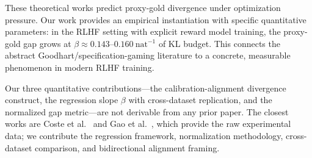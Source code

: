 These theoretical works predict proxy-gold divergence under optimization pressure. Our work provides an empirical instantiation with specific quantitative parameters: in the RLHF setting with explicit reward model training, the proxy-gold gap grows at $\beta \approx 0.143$--$0.160\ \text{nat}^{-1}$ of KL budget. This connects the abstract Goodhart/specification-gaming literature to a concrete, measurable phenomenon in modern RLHF training.

Our three quantitative contributions---the calibration-alignment divergence construct, the regression slope $\beta$ with cross-dataset replication, and the normalized gap metric---are not derivable from any prior paper. The closest works are Coste et al.~\cite{Coste2023Reward} and Gao et al.~\cite{Gao2023Scaling}, which provide the raw experimental data; we contribute the regression framework, normalization methodology, cross-dataset comparison, and bidirectional alignment framing.

